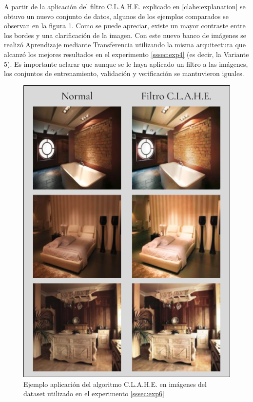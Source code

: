 A partir de la aplicación del filtro C.L.A.H.E. explicado en \ref{clahe:explanation} se obtuvo un nuevo conjunto de datos, algunos de los ejemplos comparados se observan en la figura \ref{fig:normal_vs_clahe}. Como se puede apreciar, existe un mayor contraste entre los bordes y una clarificación de la imagen. Con este nuevo banco de imágenes se realizó Aprendizaje mediante Transferencia utilizando la misma arquitectura que alcanzó los mejores resultados en el experimento \ref{sssec:exp4} (es decir, la Variante 5). Es importante aclarar que aunque se le haya aplicado un filtro a las imágenes, los conjuntos de entrenamiento, validación y verificación se mantuvieron iguales.

\begin{figure}[h!]
	\centering
	\includegraphics[width=1\linewidth, height=1\textheight]{images/normal_vs_clahe_png}
	\caption[Ejemplo aplicación del algoritmo C.L.A.H.E. en imágenes del dataset utilizado en el experimento \ref{sssec:exp6}]{Ejemplo aplicación del algoritmo C.L.A.H.E. en imágenes del dataset utilizado en el experimento \ref{sssec:exp6}}
	\label{fig:normal_vs_clahe}
\end{figure}

